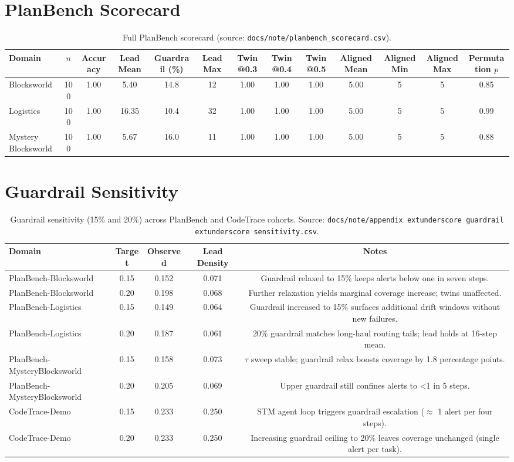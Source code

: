 \documentclass[11pt]{article}
\begin{document}
\section{PlanBench Scorecard}
\label{app:scorecard}
\begin{table}[h]
  \centering
  \caption{Full PlanBench scorecard (source: \texttt{docs/note/planbench\_scorecard.csv}).}
  \begin{tabular}{lcccccccccccc}
    \hline
    Domain & $n$ & Accuracy & Lead Mean & Guardrail (\%) & Lead Max & Twin@0.3 & Twin@0.4 & Twin@0.5 & Aligned Mean & Aligned Min & Aligned Max & Permutation $p$\\
    \hline
    Blocksworld & 100 & 1.00 & 5.40 & 14.8 & 12 & 1.00 & 1.00 & 1.00 & 5.00 & 5 & 5 & 0.85\\
    Logistics & 100 & 1.00 & 16.35 & 10.4 & 32 & 1.00 & 1.00 & 1.00 & 5.00 & 5 & 5 & 0.99\\
    Mystery Blocksworld & 100 & 1.00 & 5.67 & 16.0 & 11 & 1.00 & 1.00 & 1.00 & 5.00 & 5 & 5 & 0.88\\
    \hline
  \end{tabular}
\end{table}

\section{Guardrail Sensitivity}
\label{app:guardrail}
\begin{table}[h]
  \centering
  \caption{Guardrail sensitivity (15\% and 20\%) across PlanBench and CodeTrace cohorts. Source: \texttt{docs/note/appendix	extunderscore guardrail	extunderscore sensitivity.csv}.}
  \begin{tabular}{lcccc}
    \hline
    Domain & Target & Observed & Lead Density & Notes\\
    \hline
    PlanBench-Blocksworld & 0.15 & 0.152 & 0.071 & Guardrail relaxed to 15\% keeps alerts below one in seven steps.\\
    PlanBench-Blocksworld & 0.20 & 0.198 & 0.068 & Further relaxation yields marginal coverage increase; twins unaffected.\\
    PlanBench-Logistics & 0.15 & 0.149 & 0.064 & Guardrail increased to 15\% surfaces additional drift windows without new failures.\\
    PlanBench-Logistics & 0.20 & 0.187 & 0.061 & 20\% guardrail matches long-haul routing tails; lead holds at 16-step mean.\\
    PlanBench-MysteryBlocksworld & 0.15 & 0.158 & 0.073 & $\tau$ sweep stable; guardrail relax boosts coverage by 1.8 percentage points.\\
    PlanBench-MysteryBlocksworld & 0.20 & 0.205 & 0.069 & Upper guardrail still confines alerts to <1 in 5 steps.\\
    CodeTrace-Demo & 0.15 & 0.233 & 0.250 & STM agent loop triggers guardrail escalation ($\approx$ 1 alert per four steps).\\
    CodeTrace-Demo & 0.20 & 0.233 & 0.250 & Increasing guardrail ceiling to 20\% leaves coverage unchanged (single alert per task).\\
    \hline
  \end{tabular}
\end{table}
\end{document}
